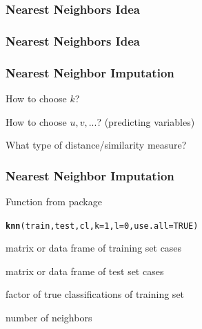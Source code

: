 \documentclass[12pt]{beamer}\usepackage[]{graphicx}\usepackage[]{color}
\makeatletter
\newcommand{\hlnum}[1]{\textcolor[rgb]{0.686,0.059,0.569}{#1}}%
\newcommand{\hlstd}[1]{\textcolor[rgb]{0.345,0.345,0.345}{#1}}%
\newcommand{\hlkwc}[1]{\textcolor[rgb]{0.333,0.667,0.333}{#1}}%
\newcommand{\hlkwd}[1]{\textcolor[rgb]{0.737,0.353,0.396}{\textbf{#1}}}%
\newenvironment{kframe}{%
 \def\at@end@of@kframe{}%
 \ifinner\ifhmode%
  \def\at@end@of@kframe{\end{minipage}}%
  \begin{minipage}{\columnwidth}%
 \fi\fi%
 \def\FrameCommand##1{\hskip\@totalleftmargin \hskip-\fboxsep
 \colorbox{shadecolor}{##1}\hskip-\fboxsep
     \hskip-\linewidth \hskip-\@totalleftmargin \hskip\columnwidth}%
 \MakeFramed {\advance\hsize-\width
   \@totalleftmargin\z@ \linewidth\hsize
   \@setminipage}}%
 {\par\unskip\endMakeFramed%
 \at@end@of@kframe}
\newenvironment{knitrout}{}{} %
\makeatother
\begin{document}

\begin{frame}
\frametitle{Nearest Neighbors Idea}
\begin{center}
\end{center}
\end{frame}


\begin{frame}
\frametitle{Nearest Neighbors Idea}
\begin{center}
\end{center}
\end{frame}


\begin{frame}[fragile]
\frametitle{Nearest Neighbor Imputation}

\bbi
  \item How to choose $k$?
  \item How to choose $u, v, ...$? (predicting variables)
  \item What type of distance/similarity measure?
\ei
\eb

\end{frame}


\begin{frame}[fragile]
\frametitle{Nearest Neighbor Imputation}

Function {\hilit {}} from package 
\begin{knitrout}\footnotesize
{}\color{fgcolor}\begin{kframe}
\begin{alltt}
\hlkwd{knn}\hlstd{(train, test, cl,} \hlkwc{k} \hlstd{=} \hlnum{1}\hlstd{,} \hlkwc{l} \hlstd{=} \hlnum{0}\hlstd{,} \hlkwc{use.all} \hlstd{=} \hlnum{TRUE}\hlstd{)}
\end{alltt}
\end{kframe}
\end{knitrout}

\bi
  \item {} matrix or data frame of training set cases
  \item {} matrix or data frame of test set cases
  \item {} factor of true classifications of training set
  \item {} number of neighbors
\ei

\end{frame}
\end{document}

